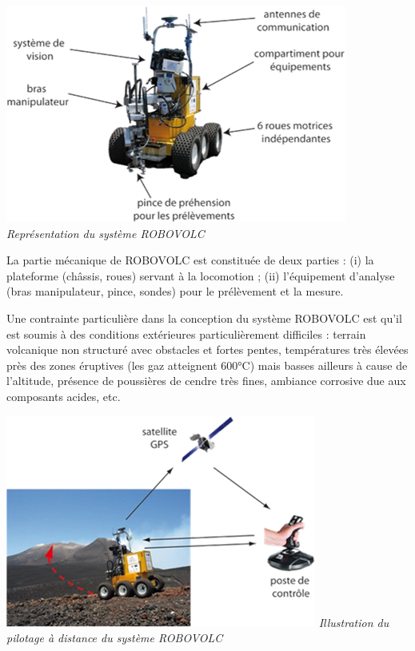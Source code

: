 \documentclass[10pt,fleqn]{article} %
\begin{document}
\begin{multicols}{2}
\begin{center}
\includegraphics[width=\linewidth]{images/fig_02}
\textit{Représentation du système ROBOVOLC}
\end{center}


La partie mécanique de ROBOVOLC est constituée de deux parties : (i) la plateforme (châssis, roues) servant à la locomotion ; (ii) l'équipement d'analyse (bras manipulateur, pince, sondes) pour le prélèvement et la mesure.

Une contrainte particulière dans la conception du système ROBOVOLC est qu'il est soumis à des conditions extérieures particulièrement difficiles : terrain volcanique non structuré avec obstacles et fortes pentes, températures très élevées près des zones éruptives (les gaz atteignent 600°C) mais basses ailleurs à cause de l'altitude, présence de poussières de cendre très fines, ambiance corrosive due aux composants acides, etc.


\begin{center}
\includegraphics[width=\linewidth]{images/fig_03}
\textit{Illustration du pilotage à distance du système ROBOVOLC}
\end{center}


\end{multicols}
\end{document}

